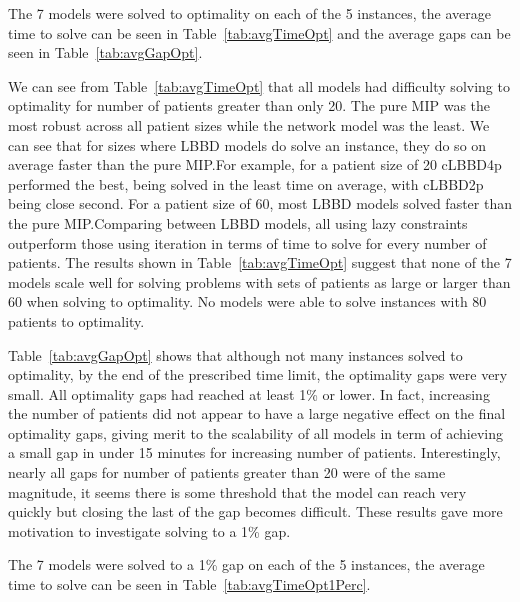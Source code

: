 The 7 models were solved to optimality on each of the 5 instances, the average time to solve can be seen in Table~\ref{tab:avgTimeOpt} and the average gaps can be seen in Table~\ref{tab:avgGapOpt}.



We can see from Table~\ref{tab:avgTimeOpt} that all models had difficulty solving to optimality for number of patients greater than only 20. The pure MIP was the most robust across all patient sizes while the network model was the least. We can see that for sizes where LBBD models do solve an instance, they do so on average faster than the pure MIP.\@ For example, for a patient size of 20 cLBBD4p performed the best, being solved in the least time on average, with cLBBD2p being close second. For a patient size of 60, most LBBD models solved faster than the pure MIP.\@ Comparing between LBBD models, all using lazy constraints outperform those using iteration in terms of time to solve for every number of patients. The results shown in Table~\ref{tab:avgTimeOpt} suggest that none of the 7 models scale well for solving problems with sets of patients as large or larger than 60 when solving to optimality. No models were able to solve instances with 80 patients to optimality. 



Table~\ref{tab:avgGapOpt} shows that although not many instances solved to optimality, by the end of the prescribed time limit, the optimality gaps were very small. All optimality gaps had reached at least 1\% or lower. In fact, increasing the number of patients did not appear to have a large negative effect on the final optimality gaps, giving merit to the scalability of all models in term of achieving a small gap in under 15 minutes for increasing number of patients. Interestingly, nearly all gaps for number of patients greater than 20 were of the same magnitude, it seems there is some threshold that the model can reach very quickly but closing the last of the gap becomes difficult. These results gave more motivation to investigate solving to a 1\% gap.

The 7 models were solved to a 1\% gap on each of the 5 instances, the average time to solve can be seen in Table~\ref{tab:avgTimeOpt1Perc}.


%  


